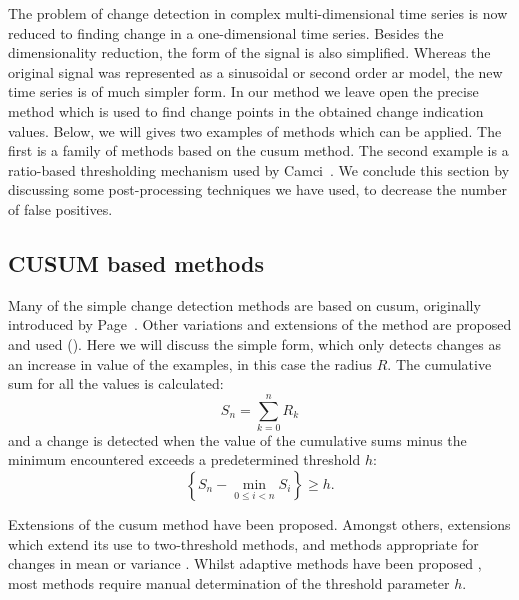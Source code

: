 The problem of change detection in complex multi-dimensional time series is now reduced to finding change in a one-dimensional time series.
Besides the dimensionality reduction, the form of the signal is also simplified.
Whereas the original signal was represented as a sinusoidal or second order \gls{ar} model, the new time series is of much simpler form.
In our method we leave open the precise method which is used to find change points in the obtained change indication values.
Below, we will gives two examples of methods which can be applied.
The first is a family of methods based on the \gls{cusum} method.
The second example is a ratio-based thresholding mechanism used by Camci~\cite{camci2010change}.
We conclude this section by discussing some post-processing techniques we have used, to decrease the number of false positives.

\subsection{CUSUM based methods}
Many of the simple change detection methods are based on \gls{cusum}, originally introduced by Page~\cite{page1954continuous}.
Other variations and extensions of the method are proposed and used (\cite{inclan1994use,alippi2006adaptive,hsu2007mosum}).
Here we will discuss the simple form, which only detects changes as an increase in value of the examples, in this case the radius $R$.
The cumulative sum for all the values is calculated:
\begin{equation}
  S_n = \sum_{k=0}^n R_k
\end{equation}
and a change is detected when the value of the cumulative sums minus the minimum encountered exceeds a predetermined threshold $h$:
\begin{equation}
  \left\{ S_n - \operatorname*{min}_{0 \le i < n} S_i \right\} \ge h.
\end{equation}

Extensions of the \gls{cusum} method have been proposed.
Amongst others, extensions which extend its use to two-threshold methods, and methods appropriate for changes in mean or variance \cite{inclan1994use}.
Whilst adaptive methods have been proposed \cite{alippi2006adaptive}, most methods require manual determination of the threshold parameter $h$.


